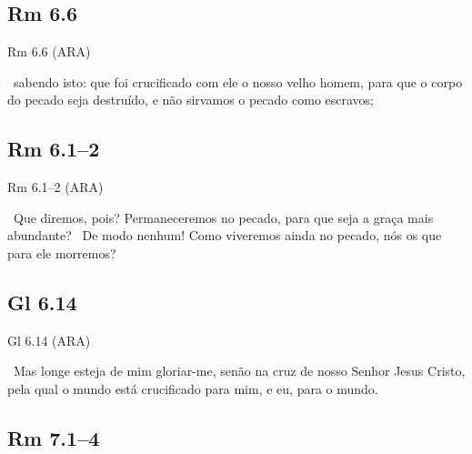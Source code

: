 \documentclass[12pt,aspectratio=169]{beamer}
\newcommand{\ver}[1]{%
    \raisebox{0.50ex}{%
        \scalebox{1.1}{%
            \pmb{\textbf{\textcolor{BSpbg}{#1}}}%
        }%
    }%
}
\newcommand{\QUOTE}[1]{%
    \par\noindent\hspace*{0.05\linewidth}%
    \begin{minipage}{0.9\linewidth}%
        \linespread{1.35}\large{#1}%
    \end{minipage}%
}
\newcommand{\RED}[1]{{\textcolor{TXred}{#1}}}
\newcommand{\YEL}[1]{{\textcolor{TXyel}{#1}}}
\begin{document}
    \subsection{Rm 6.6}

    \begin{frame}{Rm 6.6 (ARA)}
        \QUOTE{%
            \ver{6}~sabendo isto: que \YEL{foi crucificado com ele o nosso velho homem}, para
            que o corpo do pecado seja destruído, e não sirvamos o pecado como escravos;
        }
    \end{frame}

    \subsection{Rm 6.1--2}

    \begin{frame}{Rm 6.1--2 (ARA)}
        \QUOTE{%
            \ver{1}~Que diremos, pois? Permaneceremos no \RED{pecado}, para que seja a graça
            mais abundante?
            \ver{2}~De modo nenhum! Como viveremos ainda no \RED{pecado}, \YEL{nós os que para
            ele morremos}?
        }
    \end{frame}

    \subsection{Gl 6.14}

    \begin{frame}{Gl 6.14 (ARA)}
        \QUOTE{%
            \ver{14}~Mas longe esteja de mim gloriar-me, senão na cruz de nosso Senhor Jesus
            Cristo, pela qual \YEL{o mundo está crucificado para mim, e eu, para o mundo}.
        }
    \end{frame}

    \subsection{Rm 7.1--4}
\end{document}
